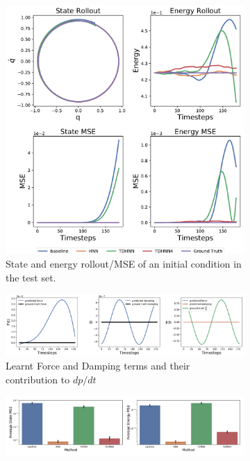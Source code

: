 \documentclass[twoside]{article}
\begin{document}
\begin{figure}[h!]
\centering
\captionsetup{justification=centering}
	\begin{subfigure}[b]{0.4\textwidth}
		\centering
		\includegraphics[width=\textwidth]{figures/mass_spring_long_new.pdf}
		\caption{State and energy rollout/MSE of an initial condition in the test set.}
	\end{subfigure}
	\begin{subfigure}[b]{0.48\textwidth}
		\centering
		\includegraphics[width=\textwidth]{figures/dpdt_mass_spring.pdf}
		\caption{Learnt Force and Damping terms and their contribution to $dp/dt$}
	\end{subfigure}
	\begin{subfigure}[b]{0.48\textwidth}
	    \centering
		\includegraphics[width=\textwidth]{figures/mass_spring_errors.pdf}

\end{subfigure}
\end{figure}
\end{document}
